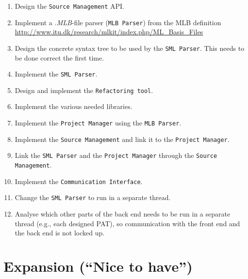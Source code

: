 \documentclass[a4paper,oneside]{article}
\begin{document}
\begin{enumerate}
\item Design the \texttt{Source Management} API.

\item Implement a \textit{.MLB}-file parser (\texttt{MLB Parser}) from the MLB
  definition \url{http://www.itu.dk/research/mlkit/index.php/ML_Basis_Files}

\item Design the concrete syntax tree to be used by the \texttt{SML
    Parser}. This needs to be done correct the first time.

\item Implement the \texttt{SML Parser}.

\item Design and implement the \texttt{Refactoring tool}.

\item Implement the various needed libraries.

\item Implement the \texttt{Project Manager} using the \texttt{MLB Parser}.

\item Implement the \texttt{Source Management} and link it to the
  \texttt{Project Manager}.

\item Link the \texttt{SML Parser} and the \texttt{Project Manager} through the
  \texttt{Source Management}.

\item Implement the \texttt{Communication Interface}.

\item Change the \texttt{SML Parser} to run in a separate thread.

\item Analyse which other parts of the back end needs to be run in a separate
  thread (e.g., each designed PAT), so communication with the front end and the
  back end is not locked up.

\end{enumerate}




\section{Expansion (``Nice to have'')}
\end{document}
